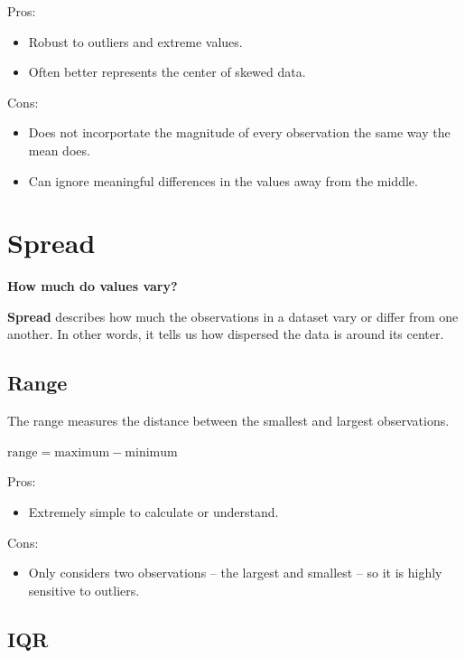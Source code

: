 \documentclass[
  letterpaper,
  DIV=11,
  numbers=noendperiod]{scrreprt}
\providecommand{\tightlist}{%
  \setlength{\itemsep}{0pt}\setlength{\parskip}{0pt}}
\begin{document}
Pros:

\begin{itemize}
\tightlist
\item
  Robust to outliers and extreme values.
\item
  Often better represents the center of skewed data.
\end{itemize}

Cons:

\begin{itemize}
\tightlist
\item
  Does not incorportate the magnitude of every observation the same way
  the mean does.
\item
  Can ignore meaningful differences in the values away from the middle.
\end{itemize}

\section{Spread}\label{spread}

\textbf{How much do values vary?}

\textbf{Spread} describes how much the observations in a dataset vary or
differ from one another. In other words, it tells us how dispersed the
data is around its center.

\subsection{Range}\label{range}

The range measures the distance between the smallest and largest
observations.

\(\text{range} = \text{maximum} - \text{minimum}\)

Pros:

\begin{itemize}
\tightlist
\item
  Extremely simple to calculate or understand.
\end{itemize}

Cons:

\begin{itemize}
\tightlist
\item
  Only considers two observations -- the largest and smallest -- so it
  is highly sensitive to outliers.
\end{itemize}

\subsection{IQR}\label{iqr}
\end{document}
